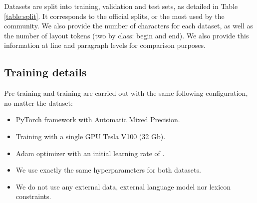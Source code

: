 Datasets are split into training, validation and test sets, as detailed in Table \ref{table:split}. It corresponds to the official splits, or the most used by the community. We also provide the number of characters for each dataset, as well as the number of layout tokens (two by class: begin and end). We also provide this information at line and paragraph levels for comparison purposes.

\begin{table}[h!]
    \caption{Datasets split in training, validation and test sets and associated number of tokens in their alphabet.}
    \centering
    \label{table:split}
\end{table}

\subsection{Training details}
Pre-training and training are carried out with the same following configuration, no matter the dataset:
\begin{itemize}
    \item PyTorch framework with Automatic Mixed Precision.
    \item Training with a single GPU Tesla V100 (32 Gb).
    \item Adam optimizer with an initial learning rate of .
    \item We use exactly the same hyperparameters for both datasets.
    \item We do not use any external data, external language model nor lexicon constraints.
\end{itemize}

